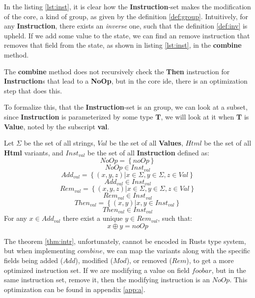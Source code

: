In the listing \ref{lst:inst}, it is clear how the \textbf{Instruction}-set makes the
modification of the core, a kind of group, as given by the definition
\ref{def:group}. Intuitively, for any \textbf{Instruction}, there exists
an \textit{inverse} one, such that the definition \ref{def:inv} is upheld. If we
add some value to the state, we can find an remove instruction that removes
that field from the state, as shown in listing \ref{lst:inst}, in the
\textbf{combine} method.

\begin{remark}
  The \textbf{combine} method does not recursively check the \textbf{Then}
  instruction for \textbf{Instruction}s that lead to a \textbf{NoOp}, but in the
  core \gls{ide}, there is an optimization step that does this.
\end{remark}

To formalize this, that the \textbf{Instruction}-set is an group, we can look at
a subset, since \textbf{Instruction} is parameterized by some type \textbf{T},
we will look at it when \textbf{T} is \textbf{Value}, noted by the subscript
\textbf{val}.

\begin{theorem} \label{thm:intr}
  Let $\Sigma$ be the set of all strings, $Val$ be the set of all
  \textbf{Values}, $Html$ be the set of all \textbf{Html} variants, and
  $Inst_{val}$ be the set of all \textbf{Instruction} defined as:
  $$
    NoOp = \left \{ noOp \right \}
  $$
  $$
    NoOp \in Inst_{val}
  $$
  $$
    Add_{val} = \left \{ (x, y, z) \vert x \in \Sigma, y \in \Sigma, z \in Val \right \}
  $$
  $$
    Add_{val} \in Inst_{val}
  $$
  $$
    Rem_{val} = \left \{ (x, y, z) \vert x \in \Sigma, y \in \Sigma, z \in Val \right \}
  $$
  $$
    Rem_{val} \in Inst_{val}
  $$
  $$
    Then_{val} = \left \{ (x, y) \vert x, y \in Inst_{val} \right \}
  $$
  $$
    Then_{val} \in Inst_{val}
  $$
  For any $x \in Add_{val}$ there exist a unique $y \in Rem_{val}$, such that:
  $$
    x \oplus y = noOp
  $$
\end{theorem}

The theorem \ref{thm:intr}, unfortunately, cannot be encoded in Rusts type
system, but when implementing $combine$, we can map the variants along with the
specific fields being added ($Add$), modified ($Mod$), or removed ($Rem$), to get
a more optimized instruction set. If we are modifying a value on field $foobar$,
but in the same instruction set, remove it, then the modifying instruction is an
$NoOp$. This optimization can be found in appendix \ref{app:a}.

